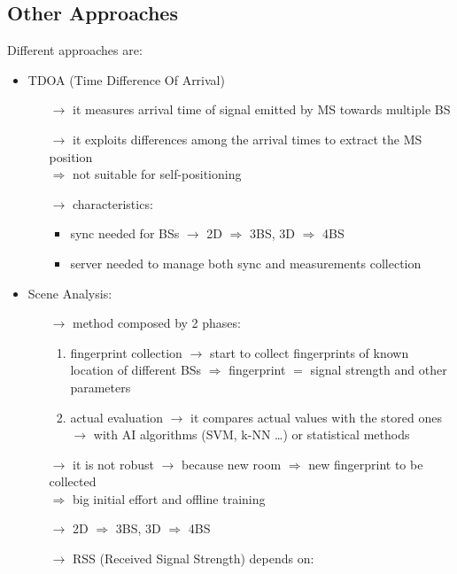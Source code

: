 \subsection{Other Approaches}
Different approaches are:
\begin{itemize}
    \item TDOA (Time Difference Of Arrival)
    \begin{itemize}
        \item[$\rightarrow$] it measures arrival time of signal emitted by MS towards multiple BS
        \item[$\rightarrow$] it exploits differences among the arrival times to extract the MS position\\
        $\Rightarrow$ not suitable for self-positioning
        \item[$\rightarrow$] characteristics:
        \begin{itemize}
            \item sync needed for BSs $\rightarrow$ 2D $\Rightarrow$ 3BS, 3D $\Rightarrow$ 4BS
            \item server needed to manage both sync and measurements collection
        \end{itemize} 
    \end{itemize}
    \item Scene Analysis:
    \begin{itemize}
        \item[$\rightarrow$] method composed by 2 phases:
        \begin{enumerate} 
            \item fingerprint collection $\rightarrow$ start to collect fingerprints of known location of
            different BSs $\Rightarrow$ fingerprint $=$ signal strength and other parameters
            \item actual evaluation $\rightarrow$ it compares actual values with the stored ones\\
            $\rightarrow$ with AI algorithms (SVM, k-NN \dots) or statistical methods
        \end{enumerate}
        \item[$\rightarrow$] it is not robust $\rightarrow$ because new room $\Rightarrow$ new fingerprint to be collected\\
        $\Rightarrow$ big initial effort and offline training
        \item[$\rightarrow$] 2D $\Rightarrow$ 3BS, 3D $\Rightarrow$ 4BS
        \item[$\rightarrow$] RSS (Received Signal Strength) depends on:

\end{itemize}
\end{itemize}
